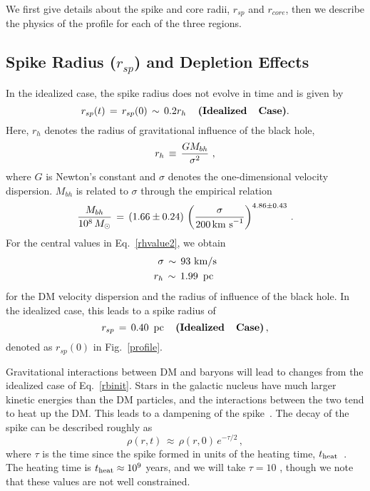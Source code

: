 \documentclass[11pt]{article}
\newcommand{\be}{\begin{equation}}
\newcommand{\ee}{\end{equation}}
\newcommand{\bea}{\begin{eqnarray}}
\newcommand{\eea}{\end{eqnarray}}
\begin{document}
We first give details about the spike and core radii, $r_{sp}$ and $r_{core}$, then we describe the physics of the profile for each of the three regions.


\subsection{Spike Radius ($r_{sp}$) and Depletion Effects}


In the idealized case, the spike radius does not evolve in time and is given by 
%
\be \label{rbinit}
r_{sp}(t) \, = \, r_{sp}(0) \, \sim \, 0.2 r_{h} \,\,\,\,\,\,\,\textbf{(Idealized \,\, Case)}.
\ee
%
Here, $r_{h}$ denotes the radius of gravitational influence of the black hole, 
%
\be
r_h \,\equiv\, {G M_{bh} \over \sigma^2} \,\,, 
\label{rhvalue}
\ee
%
where $G$ is Newton's constant and $\sigma$ denotes the one-dimensional velocity dispersion. $M_{bh}$ is related to $\sigma$ through the empirical relation~\cite{Ferrarese:2004qr}
%
\be
\frac{M_{bh}}{10^8 \, M_\odot} \,=\, (1.66 \pm 0.24) \, \left( { \sigma 
\over 200 \, \textrm{km s}^{-1} } \right)^{4.86 \pm 0.43} \,.
\label{rhvalue2}
\ee
%
For the central values in Eq.~\ref{rhvalue2}, we obtain 
%
\bea
\sigma \, \sim \, 93 \,\, {\rm km}/{\rm s} \nonumber \\
r_h \, \sim \, 1.99 \,\,\,{\rm pc} \,\,
\eea
%
for the DM velocity dispersion and the radius of influence of the black hole. In the idealized case, this leads to a spike radius of
%
\be
r_{sp} \, = \, 0.40 \,\,\,{\rm pc} \,\,\,\,\,\,\,\textbf{(Idealized \,\, Case)} \,,
\label{idealized}
\ee
%
denoted as $r_{sp}(0)$ in Fig.~\ref{profile}.

Gravitational interactions between DM and baryons will lead to changes from the idealized case of Eq.~\ref{rbinit}. Stars in the galactic nucleus have much larger kinetic energies than the DM particles, and the interactions between the two tend to heat up the DM. This leads to a dampening of the spike~\cite{Merritt:2003qk}. The decay of the spike can be described roughly as 
%
\be \label{eq:rhodamp}
\rho(r,t) \,\approx\, \rho(r,0) \, e^{-\tau/2} \,,
\ee
%
where $\tau$ is the time since the spike formed in units of the heating time, $t_{\rm heat}$~\cite{Ahn:2007ty}. The heating time is $t_{\rm heat} \approx 10^9$ years, and we will take $\tau = 10$ \cite{Bertone:2005xv}, though we note that these values are not well constrained.
\end{document}
